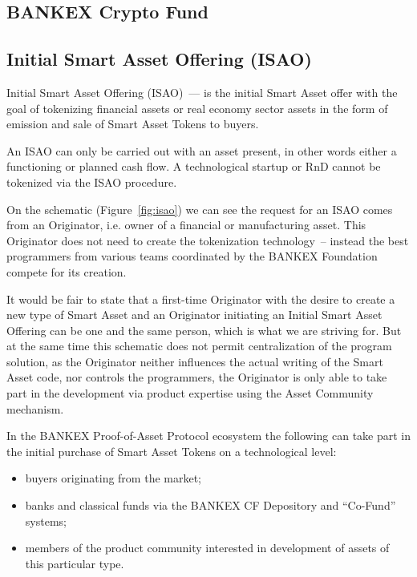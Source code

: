 \documentclass{article}
\begin{document}
\begin{multicols}{2}
\subsection{BANKEX Crypto Fund}

\text{}

\subsection{Initial Smart Asset Offering (ISAO)}

Initial Smart Asset Offering (ISAO)~--- is the initial Smart Asset offer with the goal of tokenizing financial assets or real economy sector assets in the form of emission and sale of Smart Asset Tokens to buyers.

An ISAO can only be carried out with an asset present, in other words either a functioning or planned cash flow. A technological startup or RnD cannot be tokenized via the ISAO procedure.

On the schematic (Figure~\ref{fig:isao}) we can see the request for an ISAO comes from an Originator, i.e. owner of a financial or manufacturing asset. This Originator does not need to create the tokenization technology~-- instead the best programmers from various teams coordinated by the BANKEX Foundation compete for its creation.

It would be fair to state that a first-time Originator with the desire to create a new type of Smart Asset and an Originator initiating an Initial Smart Asset Offering can be one and the same person, which is what we are striving for. But at the same time this schematic does not permit centralization of the program solution, as the Originator neither influences the actual writing of the Smart Asset code, nor controls the programmers, the Originator is only able to take part in the development via product expertise using the Asset Community mechanism. 

In the BANKEX Proof-of-Asset Protocol ecosystem the following can take part in the initial purchase of Smart Asset Tokens on a technological level:

\begin{itemize}
\item buyers originating from the market;
\item banks and classical funds via the BANKEX CF Depository and “Co-Fund” systems;
\item members of the product community interested in development of assets of this particular type.
\end{itemize}


\end{multicols}
\end{document}
